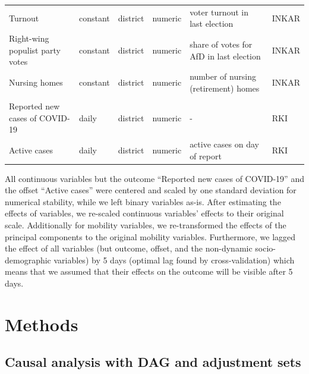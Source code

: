 \documentclass[]{elsarticle} %
\begin{document}
\begin{table}
\begin{tabular}[t]{llll>{\raggedright\arraybackslash}p{10em}l}
\hspace{1em}Turnout & constant & district & numeric & voter turnout in last election & INKAR \citep{inkar}\\
\hspace{1em}Right-wing populist party votes & constant & district & numeric & share of votes for AfD in last election & INKAR \citep{inkar}\\
\hspace{1em}Nursing homes & constant & district & numeric & number of nursing (retirement) homes & INKAR \citep{inkar}\\
\addlinespace[0.3em]
\multicolumn{6}{l}{\textbf{Case numbers}}\\
\hspace{1em}Reported new cases of COVID-19 & daily & district & numeric & - & RKI \citep{casenumbers_rki}\\
\hspace{1em}Active cases & daily & district & numeric & active cases on day of report & RKI \citep{casenumbers_rki}\\
\bottomrule
\end{tabular}
\end{table}

All continuous variables but the outcome ``Reported new cases of COVID-19'' and the offset ``Active cases'' were centered and scaled by one standard deviation for numerical stability, while we left binary variables as-is. After estimating the effects of variables, we re-scaled continuous variables' effects to their original scale. Additionally for mobility variables, we re-transformed the effects of the principal components to the original mobility variables. Furthermore, we lagged the effect of all variables (but outcome, offset, and the non-dynamic socio-demographic variables) by 5 days (optimal lag found by cross-validation) which means that we assumed that their effects on the outcome will be visible after 5 days.

\hypertarget{methods}{%
\section{Methods}\label{methods}}

\hypertarget{causal-analysis-with-dag-and-adjustment-sets}{%
\subsection{Causal analysis with DAG and adjustment sets}\label{causal-analysis-with-dag-and-adjustment-sets}}
\end{document}
